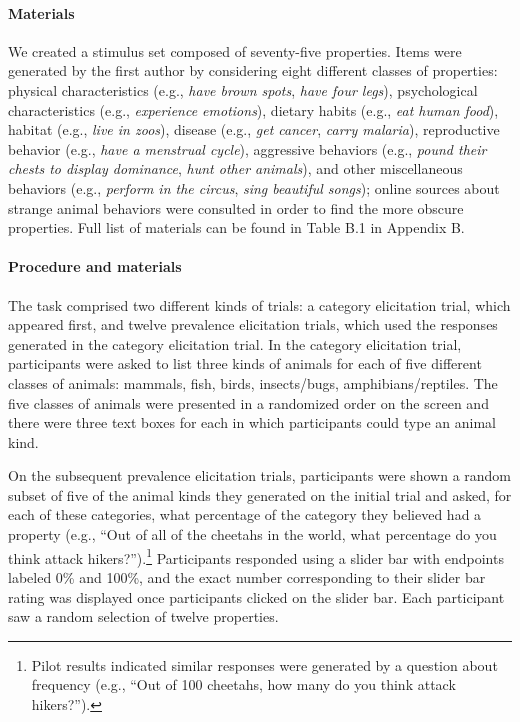 \documentclass[floatsintext,doc]{apa6}
\let\oldparagraph\paragraph
\renewcommand{\paragraph}[1]{\oldparagraph{#1}\mbox{}}
\let\rmarkdownfootnote\footnote%
\def\footnote{\protect\rmarkdownfootnote}
\begin{document}
\hypertarget{materials}{%
\paragraph{Materials}\label{materials}}
We created a stimulus set composed of seventy-five properties.
Items were generated by the first author by considering eight different classes of properties: physical characteristics (e.g., \emph{have brown spots}, \emph{have four legs}), psychological characteristics (e.g., \emph{experience emotions}), dietary habits (e.g., \emph{eat human food}), habitat (e.g., \emph{live in zoos}), disease (e.g., \emph{get cancer}, \emph{carry malaria}), reproductive behavior (e.g., \emph{have a menstrual cycle}), aggressive behaviors (e.g., \emph{pound their chests to display dominance}, \emph{hunt other animals}), and other miscellaneous behaviors (e.g., \emph{perform in the circus}, \emph{sing beautiful songs}); online sources about strange animal behaviors were consulted in order to find the more obscure properties. Full list of materials can be found in Table B.1 in Appendix B.

\hypertarget{procedure-and-materials-1}{%
\paragraph{Procedure and materials}\label{procedure-and-materials-1}}
The task comprised two different kinds of trials: a category elicitation trial, which appeared first, and twelve prevalence elicitation trials, which used the responses generated in the category elicitation trial.
In the category elicitation trial, participants were asked to list three kinds of animals for each of five different classes of animals: mammals, fish, birds, insects/bugs, amphibians/reptiles.
The five classes of animals were presented in a randomized order on the screen and there were three text boxes for each in which participants could type an animal kind.

On the subsequent prevalence elicitation trials, participants were shown a random subset of five of the animal kinds they generated on the initial trial and asked, for each of these categories, what percentage of the category they believed had a property (e.g., \enquote{Out of all of the cheetahs in the world, what percentage do you think attack hikers?}).\footnote{Pilot results indicated similar responses were generated by a question about frequency (e.g., \enquote{Out of 100 cheetahs, how many do you think attack hikers?}).} 
Participants responded using a slider bar with endpoints labeled 0\% and 100\%, and the exact number corresponding to their slider bar rating was displayed once participants clicked on the slider bar.
Each participant saw a random selection of twelve properties.
\end{document}
